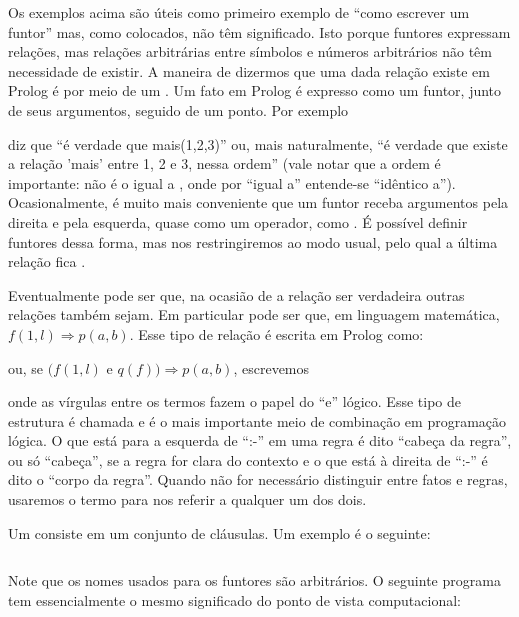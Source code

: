 Os exemplos acima são úteis como primeiro exemplo de ``como escrever um funtor'' mas, como colocados, não têm significado. Isto
porque funtores expressam relações, mas relações arbitrárias entre símbolos e números arbitrários não têm necessidade de existir.
A maneira de dizermos que uma dada relação existe em Prolog é por meio de um . Um fato em Prolog é expresso como
um funtor, junto de seus argumentos, seguido de um ponto. Por exemplo


\noindent diz que ``é verdade que mais(1,2,3)'' ou, mais naturalmente, ``é verdade que existe a relação 'mais' entre 1, 2 e 3, nessa ordem'' (vale notar que a ordem é importante:  não é o igual a , onde por ``igual a'' entende-se ``idêntico a'').
Ocasionalmente, é muito mais conveniente que um funtor receba argumentos pela direita e pela esquerda, quase como um operador,
como . É possível definir funtores dessa forma, mas nos restringiremos ao modo usual, pelo qual a última relação fica
.

Eventualmente pode ser que, na ocasião de a relação  ser verdadeira outras relações também sejam.
Em particular pode ser que, em linguagem matemática, $ f(1,l) \Rightarrow p(a,b) $. Esse tipo de relação é escrita em Prolog como:


\noindent ou, se $ (f(1,l)$ e $q(f)) \Rightarrow p(a,b) $, escrevemos


\noindent onde as vírgulas entre os termos fazem o papel do ``e'' lógico. Esse tipo de estrutura é chamada 
e é o mais importante meio de combinação em programação lógica. O que está para a esquerda de ``:-'' em uma regra é dito
``cabeça da regra'', ou só ``cabeça'', se a regra for clara do contexto e o que está à direita de ``:-'' é dito o
``corpo da regra''. Quando não for necessário distinguir entre fatos e regras, usaremos o termo  para
nos referir a qualquer um dos dois.

Um  consiste em um conjunto de cláusulas. Um exemplo é o seguinte:\\

\inputminted{prolog}{../Exemplos/Cap0/prog1_cafe.pl}\label{lst:cafe}

Note que os nomes usados para os funtores são arbitrários. O seguinte programa tem essencialmente o mesmo significado do ponto de vista computacional:\\

